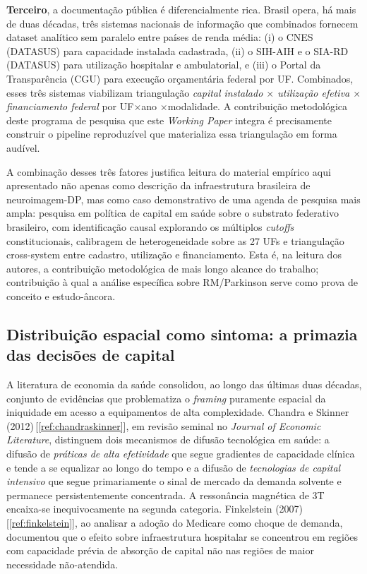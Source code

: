 \documentclass[12pt,a4paper,oneside]{article}
\begin{document}
\textbf{Terceiro}, a documentação pública é diferencialmente
rica. Brasil opera, há mais de duas décadas, três sistemas
nacionais de informação que combinados fornecem dataset analítico
sem paralelo entre países de renda média: (i) o CNES (DATASUS)
para capacidade instalada cadastrada, (ii) o SIH-AIH e o SIA-RD
(DATASUS) para utilização hospitalar e ambulatorial, e (iii) o
Portal da Transparência (CGU) para execução orçamentária federal
por UF. Combinados, esses três sistemas viabilizam triangulação
\textit{capital instalado $\times$ utilização efetiva $\times$
financiamento federal} por UF$\times$ano $\times$modalidade. A
contribuição metodológica deste programa de pesquisa \textemdash{} que
este \textit{Working Paper} integra \textemdash{} é precisamente
construir o pipeline reproduzível que materializa essa
triangulação em forma audível.

A combinação desses três fatores justifica leitura do material
empírico aqui apresentado não apenas como descrição da
infraestrutura brasileira de neuroimagem-DP, mas como caso
demonstrativo de uma agenda de pesquisa mais ampla: pesquisa em
política de capital em saúde sobre o substrato federativo
brasileiro, com identificação causal explorando os múltiplos
\textit{cutoffs} constitucionais, calibragem de heterogeneidade
sobre as 27 UFs e triangulação cross-system entre cadastro,
utilização e financiamento. Esta é, na leitura dos autores, a
contribuição metodológica de mais longo alcance do trabalho;
contribuição à qual a análise específica sobre RM/Parkinson serve
como prova de conceito e estudo-âncora.

\subsection{Distribuição espacial como sintoma: a primazia das
decisões de capital}\label{subsec:distribuicao-sintoma}

A literatura de economia da saúde consolidou, ao longo das últimas
duas décadas, conjunto de evidências que problematiza o
\textit{framing} puramente espacial da iniquidade em acesso a
equipamentos de alta complexidade. Chandra e Skinner
(2012)\,[\ref{ref:chandraskinner}], em revisão seminal no
\textit{Journal of Economic Literature}, distinguem dois mecanismos
de difusão tecnológica em saúde: a difusão de \textit{práticas
de alta efetividade} \textemdash{} que segue gradientes de
capacidade clínica e tende a se equalizar ao longo do tempo
\textemdash{} e a difusão de \textit{tecnologias de capital
intensivo} \textemdash{} que segue primariamente o sinal de mercado
da demanda solvente e permanece persistentemente concentrada. A
ressonância magnética de 3T encaixa-se inequivocamente na segunda
categoria. Finkelstein (2007)\,[\ref{ref:finkelstein}], ao
analisar a adoção do Medicare como choque de demanda, documentou
que o efeito sobre infraestrutura hospitalar se concentrou em
regiões com capacidade prévia de absorção de capital
\textemdash{} não nas regiões de maior necessidade não-atendida.
\end{document}
